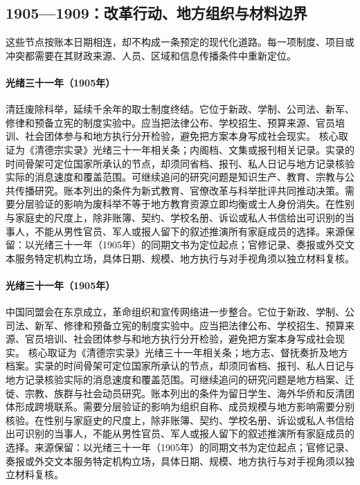\subsection{1905—1909：改革行动、地方组织与材料边界}
这些节点按账本日期相连，却不构成一条预定的现代化道路。每一项制度、项目或冲突都需要在其财政来源、人员、区域和信息传播条件中重新定位。
\hypertarget{public:EQ-1905-ABOLITION-OF-CIVIL-SERVICE-EXAM}{}\paragraph{光绪三十一年（1905年）}清廷废除科举，延续千余年的取士制度终结。它位于新政、学制、公司法、新军、修律和预备立宪的制度实验中。应当把法律公布、学校招生、预算来源、官员培训、社会团体参与和地方执行分开检验，避免把方案本身写成社会现实。 核心取证为《清德宗实录》光绪三十一年相关条；内阁档、文集或报刊相关记录。实录的时间骨架可定位国家所承认的节点，却须同省档、报刊、私人日记与地方记录核验实际的消息速度和覆盖范围。可继续追问的研究问题是知识生产、教育、宗教与公共传播研究。账本列出的条件为新式教育、官僚改革与科举批评共同推动决策。需要分层验证的影响为废科举不等于地方教育资源立即均衡或士人身份消失。在性别与家庭史的尺度上，除非账簿、契约、学校名册、诉讼或私人书信给出可识别的当事人，不能从男性官员、军人或报人留下的叙述推演所有家庭成员的选择。来源保留：以光绪三十一年（1905年）的同期文书为定位起点；官修记录、奏报或外交文本服务特定机构立场，具体日期、规模、地方执行与对手视角须以独立材料复核。
\hypertarget{public:EQ-1905-TONGMENGHUI}{}\paragraph{光绪三十一年（1905年）}中国同盟会在东京成立，革命组织和宣传网络进一步整合。它位于新政、学制、公司法、新军、修律和预备立宪的制度实验中。应当把法律公布、学校招生、预算来源、官员培训、社会团体参与和地方执行分开检验，避免把方案本身写成社会现实。 核心取证为《清德宗实录》光绪三十一年相关条；地方志、督抚奏折及地方档案。实录的时间骨架可定位国家所承认的节点，却须同省档、报刊、私人日记与地方记录核验实际的消息速度和覆盖范围。可继续追问的研究问题是地方档案、迁徙、宗教、族群与社会动员研究。账本列出的条件为留日学生、海外华侨和反清团体形成跨境联系。需要分层验证的影响为组织自称、成员规模与地方影响需要分别核验。在性别与家庭史的尺度上，除非账簿、契约、学校名册、诉讼或私人书信给出可识别的当事人，不能从男性官员、军人或报人留下的叙述推演所有家庭成员的选择。来源保留：以光绪三十一年（1905年）的同期文书为定位起点；官修记录、奏报或外交文本服务特定机构立场，具体日期、规模、地方执行与对手视角须以独立材料复核。
